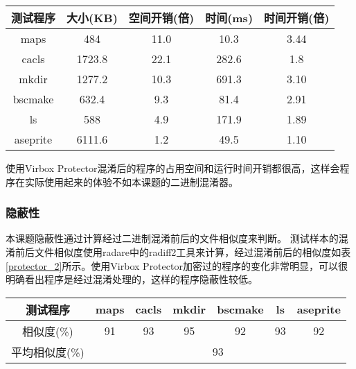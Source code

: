 \begin{table}[htbp]
	\centering
	\begin{tabular}{ccccc}
		\bottomrule[1.5pt]
		测试程序     & 大小(KB) & 空间开销(倍) & 时间(ms) & 时间开销(倍) \\ \hline
		maps     & 484    & 11.0    & 10.3   & 3.44    \\
		cacls    & 1723.8 & 22.1    & 282.6  & 1.8     \\
		mkdir    & 1277.2 & 10.3    & 691.3  & 3.10    \\
		bscmake  & 632.4  & 9.3     & 81.4   & 2.91    \\
		ls       & 588    & 4.9     & 171.9  & 1.89    \\
		aseprite & 6111.6 & 1.2     & 49.5   & 1.10    \\ 
		\toprule[1.5pt]
	\end{tabular}

	\label{ewaikaixiao}
\end{table}

使用Virbox Protector混淆后的程序的占用空间和运行时间开销都很高，这样会程序在实际使用起来的体验不如本课题的二进制混淆器。

\subsubsection{隐蔽性}

本课题隐蔽性通过计算经过二进制混淆前后的文件相似度来判断。 测试样本的混淆前后文件相似度使用radare中的radiff2工具来计算，经过混淆前后的相似度如表\ref{protector_2}所示。使用Virbox Protector加密过的程序的变化非常明显，可以很明确看出程序是经过混淆处理的，这样的程序隐蔽性较低。


\begin{table}[htbp]
	\centering

	\begin{tabular}{c|c|c|c|c|c|c}
		\bottomrule[1.5pt]
		测试程序      & maps & cacls & mkdir & bscmake & ls & aseprite \\ \hline
		相似度(\%)   & 91   & 93    & 95    & 92      & 93 & 92       \\ \hline
		平均相似度(\%) & \multicolumn{6}{c}{93}                        \\ 
		\toprule[1.5pt]
	\end{tabular}
	\label{xiangsidu}
\end{table}

